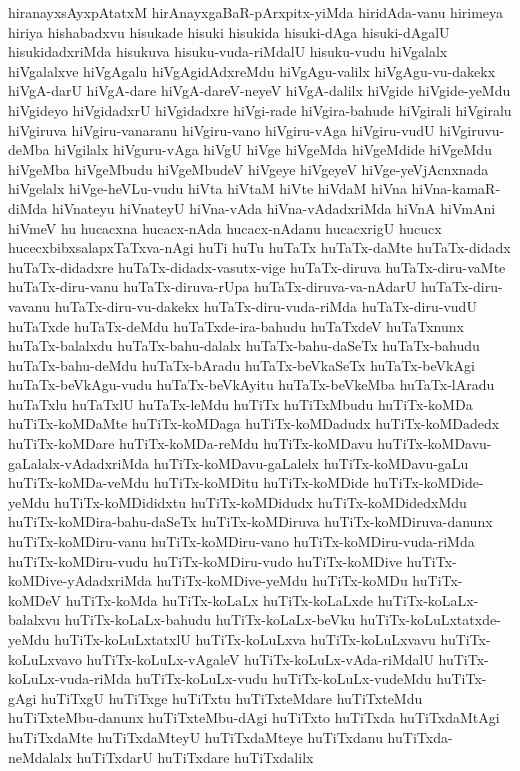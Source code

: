 {hiranayxsAyxpAtatxM
hirAnayxgaBaR-pArxpitx-yiMda
hiridAda-vanu
hirimeya
hiriya
hishabadxvu
hisukade
hisuki
hisukida
hisuki-dAga
hisuki-dAgalU
hisukidadxriMda
hisukuva
hisuku-vuda-riMdalU
hisuku-vudu
hiVgalalx
hiVgalalxve
hiVgAgalu
hiVgAgidAdxreMdu
hiVgAgu-valilx
hiVgAgu-vu-dakekx
hiVgA-darU
hiVgA-dare
hiVgA-dareV-neyeV
hiVgA-dalilx
hiVgide
hiVgide-yeMdu
hiVgideyo
hiVgidadxrU
hiVgidadxre
hiVgi-rade
hiVgira-bahude
hiVgirali
hiVgiralu
hiVgiruva
hiVgiru-vanaranu
hiVgiru-vano
hiVgiru-vAga
hiVgiru-vudU
hiVgiruvu-deMba
hiVgilalx
hiVguru-vAga
hiVgU
hiVge
hiVgeMda
hiVgeMdide
hiVgeMdu
hiVgeMba
hiVgeMbudu
hiVgeMbudeV
hiVgeye
hiVgeyeV
hiVge-yeVjAcnxnada
hiVgelalx
hiVge-heVLu-vudu
hiVta
hiVtaM
hiVte
hiVdaM
hiVna
hiVna-kamaR-diMda
hiVnateyu
hiVnateyU
hiVna-vAda
hiVna-vAdadxriMda
hiVnA
hiVmAni
hiVmeV
hu
hucacxna
hucacx-nAda
hucacx-nAdanu
hucacxrigU
hucucx
hucecxbibxsalapxTaTxva-nAgi
huTi
huTu
huTaTx
huTaTx-daMte
huTaTx-didadx
huTaTx-didadxre
huTaTx-didadx-vasutx-vige
huTaTx-diruva
huTaTx-diru-vaMte
huTaTx-diru-vanu
huTaTx-diruva-rUpa
huTaTx-diruva-va-nAdarU
huTaTx-diru-vavanu
huTaTx-diru-vu-dakekx
huTaTx-diru-vuda-riMda
huTaTx-diru-vudU
huTaTxde
huTaTx-deMdu
huTaTxde-ira-bahudu
huTaTxdeV
huTaTxnunx
huTaTx-balalxdu
huTaTx-bahu-dalalx
huTaTx-bahu-daSeTx
huTaTx-bahudu
huTaTx-bahu-deMdu
huTaTx-bAradu
huTaTx-beVkaSeTx
huTaTx-beVkAgi
huTaTx-beVkAgu-vudu
huTaTx-beVkAyitu
huTaTx-beVkeMba
huTaTx-lAradu
huTaTxlu
huTaTxlU
huTaTx-leMdu
huTiTx
huTiTxMbudu
huTiTx-koMDa
huTiTx-koMDaMte
huTiTx-koMDaga
huTiTx-koMDadudx
huTiTx-koMDadedx
huTiTx-koMDare
huTiTx-koMDa-reMdu
huTiTx-koMDavu
huTiTx-koMDavu-gaLalalx-vAdadxriMda
huTiTx-koMDavu-gaLalelx
huTiTx-koMDavu-gaLu
huTiTx-koMDa-veMdu
huTiTx-koMDitu
huTiTx-koMDide
huTiTx-koMDide-yeMdu
huTiTx-koMDididxtu
huTiTx-koMDidudx
huTiTx-koMDidedxMdu
huTiTx-koMDira-bahu-daSeTx
huTiTx-koMDiruva
huTiTx-koMDiruva-danunx
huTiTx-koMDiru-vanu
huTiTx-koMDiru-vano
huTiTx-koMDiru-vuda-riMda
huTiTx-koMDiru-vudu
huTiTx-koMDiru-vudo
huTiTx-koMDive
huTiTx-koMDive-yAdadxriMda
huTiTx-koMDive-yeMdu
huTiTx-koMDu
huTiTx-koMDeV
huTiTx-koMda
huTiTx-koLaLx
huTiTx-koLaLxde
huTiTx-koLaLx-balalxvu
huTiTx-koLaLx-bahudu
huTiTx-koLaLx-beVku
huTiTx-koLuLxtatxde-yeMdu
huTiTx-koLuLxtatxlU
huTiTx-koLuLxva
huTiTx-koLuLxvavu
huTiTx-koLuLxvavo
huTiTx-koLuLx-vAgaleV
huTiTx-koLuLx-vAda-riMdalU
huTiTx-koLuLx-vuda-riMda
huTiTx-koLuLx-vudu
huTiTx-koLuLx-vudeMdu
huTiTx-gAgi
huTiTxgU
huTiTxge
huTiTxtu
huTiTxteMdare
huTiTxteMdu
huTiTxteMbu-danunx
huTiTxteMbu-dAgi
huTiTxto
huTiTxda
huTiTxdaMtAgi
huTiTxdaMte
huTiTxdaMteyU
huTiTxdaMteye
huTiTxdanu
huTiTxda-neMdalalx
huTiTxdarU
huTiTxdare
huTiTxdalilx
}
